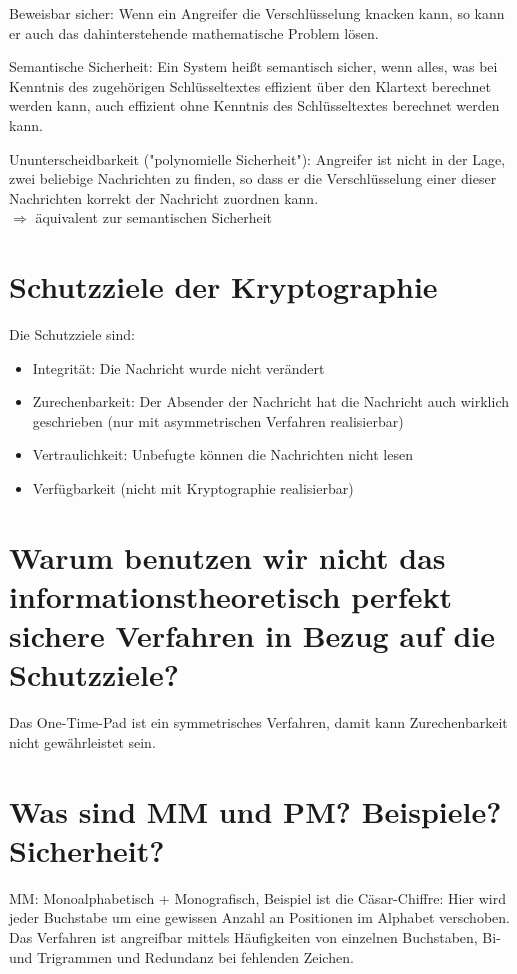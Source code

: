 \documentclass{article}
\begin{document}
	Beweisbar sicher: Wenn ein Angreifer die Verschlüsselung knacken kann, so kann er auch das dahinterstehende mathematische Problem lösen.
	
	Semantische Sicherheit: Ein System heißt semantisch sicher, wenn alles, was bei Kenntnis des zugehörigen Schlüsseltextes effizient über den Klartext berechnet werden kann, auch effizient ohne Kenntnis des Schlüsseltextes berechnet werden kann.
	
	Ununterscheidbarkeit ("polynomielle Sicherheit"): Angreifer ist nicht in der Lage, zwei beliebige Nachrichten zu finden, so dass er die Verschlüsselung einer dieser Nachrichten korrekt der Nachricht zuordnen kann. \\
	$\Rightarrow$ äquivalent zur semantischen Sicherheit
	
	\section*{Schutzziele der Kryptographie}
	
	Die Schutzziele sind:
	\begin{itemize}
		\item Integrität: Die Nachricht wurde nicht verändert
		\item Zurechenbarkeit: Der Absender der Nachricht hat die Nachricht auch wirklich geschrieben (nur mit asymmetrischen Verfahren realisierbar)
		\item Vertraulichkeit: Unbefugte können die Nachrichten nicht lesen
		\item Verfügbarkeit (nicht mit Kryptographie realisierbar)
	\end{itemize}
	
	\section*{Warum benutzen wir nicht das informationstheoretisch perfekt sichere Verfahren in Bezug auf die Schutzziele?}
	
	Das One-Time-Pad ist ein symmetrisches Verfahren, damit kann Zurechenbarkeit nicht gewährleistet sein.
	
	\section*{Was sind MM und PM? Beispiele? Sicherheit?}
	
	MM: Monoalphabetisch + Monografisch, Beispiel ist die Cäsar-Chiffre: Hier wird jeder Buchstabe um eine gewissen Anzahl an Positionen im Alphabet verschoben. Das Verfahren ist angreifbar mittels Häufigkeiten von einzelnen Buchstaben, Bi- und Trigrammen und Redundanz bei fehlenden Zeichen.
	
\end{document}

